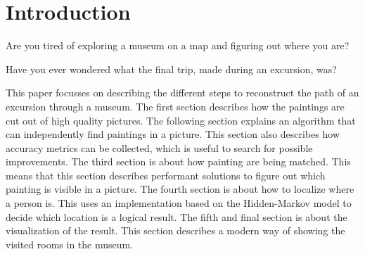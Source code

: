 \section{Introduction}

Are you tired of exploring a museum on a map and figuring out where you are?

Have you ever wondered what the final trip, made during an excursion, was?

This paper focusses on describing the different steps to reconstruct the path of an excursion through a museum. The first section describes how the paintings are cut out of high quality pictures. The following section explains an algorithm that can independently find paintings in a picture. This section also describes how accuracy metrics can be collected, which is useful to search for possible improvements. The third section is about how painting are being matched. This means that this section describes performant solutions to figure out which painting is visible in a picture. The fourth section is about how to localize where a person is. This uses an implementation based on the Hidden-Markov model to decide which location is a logical result. The fifth and final section is about the visualization of the result. This section describes a modern way of showing the visited rooms in the museum.
